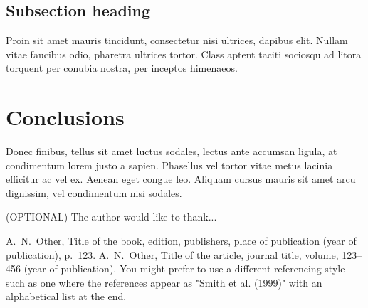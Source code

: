 \documentclass[12pt, onecolumn]{revtex4-2}    %
\begin{document}
\subsection{Subsection heading} 

Proin sit amet mauris tincidunt, consectetur nisi ultrices, dapibus elit. Nullam vitae faucibus odio, pharetra ultrices tortor. Class aptent taciti sociosqu ad litora torquent per conubia nostra, per inceptos himenaeos. 

\section{Conclusions}
 
Donec finibus, tellus sit amet luctus sodales, lectus ante accumsan ligula, at condimentum lorem justo a sapien. Phasellus vel tortor vitae metus lacinia efficitur ac vel ex. Aenean eget congue leo. Aliquam cursus mauris sit amet arcu dignissim, vel condimentum nisi sodales. 

\begin{acknowledgments}
(OPTIONAL) The author would like to thank...
\end{acknowledgments}

\begin{thebibliography}{}
 A.~N.~Other, Title of the book, edition, publishers, place of publication (year of publication), p.~123.   %
 A.~N.~Other, Title of the article, journal title, volume, 123--456 (year of publication).   %
 You might prefer to use a different referencing style such as one where the references appear as "Smith et al. (1999)" with an alphabetical list at the end.

\end{thebibliography} 
\end{document}

